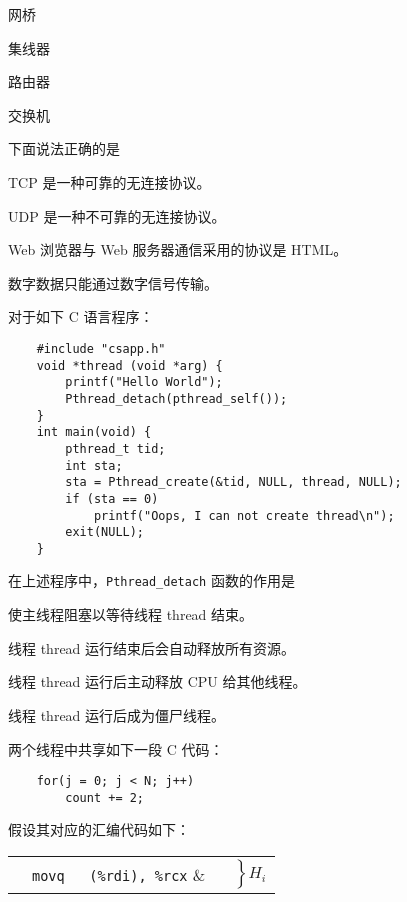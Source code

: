 \begin{problems}
\begin{choices}
            \item 网桥
            \item 集线器
            \item 路由器
            \item 交换机
        \end{choices}
         下面说法正确的是
        \begin{choices}
            \item TCP 是一种可靠的无连接协议。
            \item UDP 是一种不可靠的无连接协议。
            \item Web 浏览器与 Web 服务器通信采用的协议是 HTML。
            \item 数字数据只能通过数字信号传输。
        \end{choices}
         对于如下 C 语言程序：
        \begin{verbatim}
    #include "csapp.h"
    void *thread (void *arg) {
        printf("Hello World");
        Pthread_detach(pthread_self());
    }
    int main(void) {
        pthread_t tid;
        int sta;
        sta = Pthread_create(&tid, NULL, thread, NULL);
        if (sta == 0)
            printf("Oops, I can not create thread\n");
        exit(NULL);
    }
        \end{verbatim}
        在上述程序中，\verb|Pthread_detach| 函数的作用是
        \begin{choices}
            \item 使主线程阻塞以等待线程 thread 结束。
            \item 线程 thread 运行结束后会自动释放所有资源。
            \item 线程 thread 运行后主动释放 CPU 给其他线程。
            \item 线程 thread 运行后成为僵尸线程。
        \end{choices}
         两个线程中共享如下一段 C 代码：
        \begin{verbatim}
    for(j = 0; j < N; j++)
        count += 2;
        \end{verbatim}
        假设其对应的汇编代码如下：
        \begin{table}[H]
            \centering
            \begin{tabular}{lll}
                & \verb|movq   (%rdi), %rcx| & \multirow{4}{*}{$\left. \begin{aligned} \\ \\ \\ \end{aligned} \right\}H_i$} \\

\end{tabular}
\end{table}
\end{problems}
